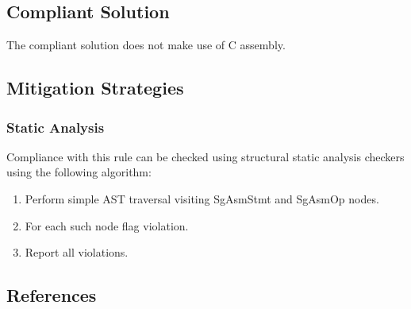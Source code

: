 \subsection{Compliant Solution}
The compliant solution does not make use of C assembly.

\subsection{Mitigation Strategies}
\subsubsection{Static Analysis} 

Compliance with this rule can be checked using structural static analysis checkers using the following algorithm:

\begin{enumerate}
\item Perform simple AST traversal visiting SgAsmStmt and SgAsmOp nodes.
\item For each such node flag violation.
\item Report all violations. 
\end{enumerate}

\subsection{References}

